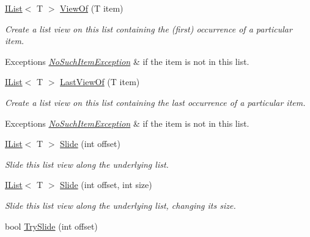 \begin{DoxyCompactItemize}
\begin{DoxyCompactList}
\end{DoxyCompactList}\item 
\hyperlink{interface_c5_1_1_i_list}{I\+List}$<$ T $>$ \hyperlink{interface_c5_1_1_i_list_aefcdef9983913d18ae05394e77a44c71}{View\+Of} (T item)
\begin{DoxyCompactList}\small\item\em Create a list view on this list containing the (first) occurrence of a particular item. 
\begin{DoxyExceptions}{Exceptions}
{\em \hyperlink{class_c5_1_1_no_such_item_exception}{No\+Such\+Item\+Exception}} & if the item is not in this list. \\
\hline
\end{DoxyExceptions}
\end{DoxyCompactList}\item 
\hyperlink{interface_c5_1_1_i_list}{I\+List}$<$ T $>$ \hyperlink{interface_c5_1_1_i_list_a251c36fe72c9bc661d449bfd0ea90528}{Last\+View\+Of} (T item)
\begin{DoxyCompactList}\small\item\em Create a list view on this list containing the last occurrence of a particular item. 
\begin{DoxyExceptions}{Exceptions}
{\em \hyperlink{class_c5_1_1_no_such_item_exception}{No\+Such\+Item\+Exception}} & if the item is not in this list. \\
\hline
\end{DoxyExceptions}
\end{DoxyCompactList}\item 
\hyperlink{interface_c5_1_1_i_list}{I\+List}$<$ T $>$ \hyperlink{interface_c5_1_1_i_list_a5ef3eff3f13a9a69071dacefbf43f80b}{Slide} (int offset)
\begin{DoxyCompactList}\small\item\em Slide this list view along the underlying list. \end{DoxyCompactList}\item 
\hyperlink{interface_c5_1_1_i_list}{I\+List}$<$ T $>$ \hyperlink{interface_c5_1_1_i_list_a20b4e11e6d69d4251af92b666aa16004}{Slide} (int offset, int size)
\begin{DoxyCompactList}\small\item\em Slide this list view along the underlying list, changing its size. \end{DoxyCompactList}\item 
bool \hyperlink{interface_c5_1_1_i_list_a727578a3060d08dba6a065c5d90b77bd}{Try\+Slide} (int offset)
\item 

\end{DoxyCompactItemize}
